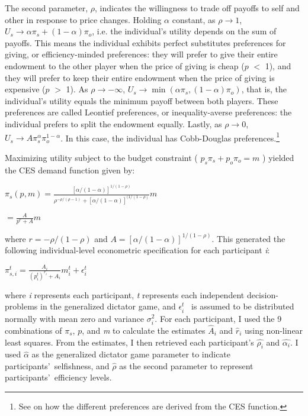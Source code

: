 \documentclass[12pt]{article}
\begin{document}
The second parameter, \(\rho\), indicates the willingness to trade off payoffs to self and other in response to price changes. Holding \(\alpha\) constant, as \(\rho \rightarrow 1\), \(U_{s} \rightarrow \alpha\pi_{s} + (1-\alpha)\pi_{o}\),  i.e. the individual\rq s utility depends on the sum of payoffs. This means the individual exhibits perfect substitutes preferences for giving, or efficiency-minded preferences: they will prefer to give their entire endowment to the other player when the price of giving is cheap (\(p\) $<$ 1), and they will prefer to keep their entire endowment when the price of giving is expensive (\(p\) $>$ 1). As \(\rho \rightarrow -\infty\), \(U_{s} \rightarrow \min(\alpha\pi_{s}, (1-\alpha)\pi_{o})\), that is, the individual\rq s utility equals the minimum payoff between both players. These preferences are called Leontief preferences, or inequality-averse preferences: the individual prefers to split the endowment equally. Lastly, as \(\rho \rightarrow 0\), \(U_{s} \rightarrow A\pi_{s}^{\alpha}\pi_{o}^{1-\alpha}\). In this case, the individual has Cobb-Douglas preferences.\footnote{See \cite{arrow_1961} on how the different preferences are derived from the CES function.}

Maximizing utility subject to the budget constraint ( \(p_{s}\pi_{s} + p_{o}\pi_{o}=m\) ) yielded the CES demand function given by:
 
\vspace{3mm} \(\pi_{s}(p,m)=\frac{[\alpha/(1-\alpha)]^{1/(1-\rho)}}{\rho^{-\rho/(\rho-1)}+[\alpha/(1-\alpha)]^{(1/(1-\rho)}}m\)

\vspace{4mm} \hspace{14.5mm} \(= \frac{A}{p^{r}+A}m\)
 
\vspace{3mm} \noindent where \(r=-\rho / (1-\rho) \) and \(A=[\alpha / (1-\alpha)]^{1/(1-\rho)} \). This generated the following individual-level econometric specification for each participant \textit{i}: 
 
\vspace{3mm} \( \pi^{t}_{s,i} = \frac{A_{i}}{(p^{t}_{i})^{r_{i}} + A_{i}}m^{t}_{i} + \epsilon^{t}_{i}\)
 
\vspace{3mm} \noindent where \textit{i} represents each participant, \textit{t} represents each independent decision-problems in the generalized dictator game, and \( \epsilon^{t}_{i} \) \ is assumed to be distributed normally with mean zero and variance \(\sigma^{2}_{i}\). For each participant, I used the 9 combinations of \(\pi_{s}\), \(p\), and \textit{m} to calculate the estimates  \( \hat{A}_{i} \) and \( \hat{r}_{i} \) using non-linear least squares. From the estimates, I then retrieved each participant\rq s \( \hat{\rho_{i}}\) and \( \hat{\alpha_{i}} \). I used \(\hat{\alpha}\) as the generalized dictator game parameter to indicate participants\rq \ selfishness, and \(\hat{\rho}\) as the second parameter to represent participants\rq \ efficiency levels.
\end{document}
